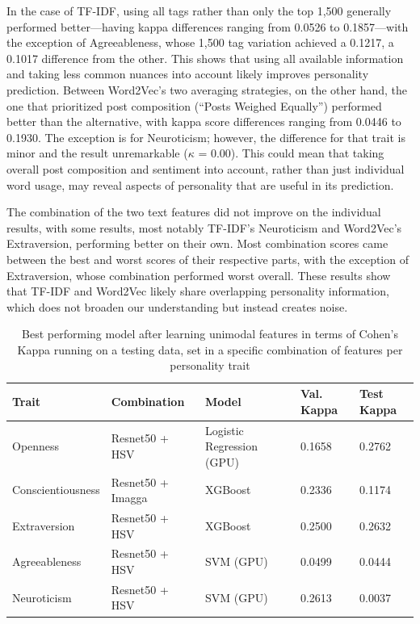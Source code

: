 In the case of TF-IDF, using all tags rather than only the top 1,500 generally performed better—having kappa differences ranging from 0.0526 to 0.1857—with the exception of Agreeableness, whose 1,500 tag variation achieved a 0.1217, a 0.1017 difference from the other. This shows that using all available information and taking less common nuances into account likely improves personality prediction. Between Word2Vec’s two averaging strategies, on the other hand, the one that prioritized post composition (“Posts Weighed Equally”) performed better than the alternative, with kappa score differences ranging from 0.0446 to 0.1930. The exception is for Neuroticism; however, the difference for that trait is minor and the result unremarkable ($\kappa$ = 0.00). This could mean that taking overall post composition and sentiment into account, rather than just individual word usage, may reveal aspects of personality that are useful in its prediction. 

The combination of the two text features did not improve on the individual results, with some results, most notably TF-IDF’s Neuroticism and Word2Vec’s Extraversion, performing better on their own. Most combination scores came between the best and worst scores of their respective parts, with the exception of Extraversion, whose combination performed worst overall. These results show that TF-IDF and Word2Vec likely share overlapping personality information, which does not broaden our understanding but instead creates noise.

\begin{table}[H]
    \centering
    \caption{Best performing model after learning unimodal features in terms of Cohen's Kappa running on a testing data, set in a specific combination of features per personality trait}
    \label{tab:uni_kappa}
    \begin{tabularx}{\textwidth}{l|X|X|X|l}
    \hline
        \textbf{Trait} & \textbf{Combination} & \textbf{Model} & \textbf{Val. Kappa} & \textbf{Test Kappa} \\ \hline
        Openness & Resnet50 + HSV & Logistic Regression (GPU) & 0.1658 & 0.2762 \\ \hline
        Conscientiousness & Resnet50 + Imagga & XGBoost & 0.2336 &  0.1174 \\ \hline
        Extraversion & Resnet50 + HSV & XGBoost & 0.2500 & 0.2632 \\ \hline
        Agreeableness & Resnet50 + HSV & SVM (GPU) & 0.0499 & 0.0444 \\ \hline
        Neuroticism & Resnet50 + HSV & SVM (GPU) & 0.2613 & 0.0037 \\ \hline
    \end{tabularx}
    \label{bestcohenmodel}
\end{table}


